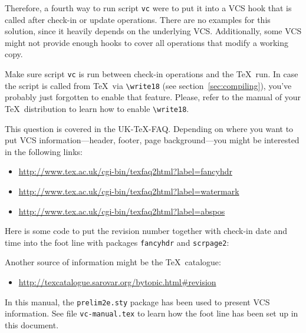 \documentclass[11pt]{article}
\begin{document}
Therefore, a fourth way to run script \texttt{vc} were to put it into a
VCS hook that is called after check-in or update operations.  There are
no examples for this solution, since it heavily depends on the
underlying VCS.  Additionally, some VCS might not provide enough hooks
to cover all operations that modify a working copy.

 Make sure script \texttt{vc} is run between
check-in operations and the \TeX\ run.  In case the script is called
from \TeX\ via \verb+\write18+ (see section~\ref{sec:compiling}), you've
probably just forgotten to enable that feature.  Please, refer to the
manual of your \TeX\ distribution to learn how to enable
\verb+\write18+.

 This question is covered in the UK-TeX-FAQ.
Depending on where you want to put VCS information---header, footer,
page background---you might be interested in the following links:
\begin{itemize}
\item \url{http://www.tex.ac.uk/cgi-bin/texfaq2html?label=fancyhdr}
\item \url{http://www.tex.ac.uk/cgi-bin/texfaq2html?label=watermark}
\item \url{http://www.tex.ac.uk/cgi-bin/texfaq2html?label=abspos}
\end{itemize}
Here is some code to put the revision number together with check-in date
and time into the foot line with packages \texttt{fancyhdr} and
\texttt{scrpage2}:
\begin{listing}[style=TeX]
\usepackage{fancyhdr}
\pagestyle{fancy}
\end{listing}
\begin{listing}[style=TeX]
\usepackage{scrpage2}
\pagestyle{scrheadings}
\end{listing}

Another source of information might be the \TeX\ catalogue:
\begin{itemize}
\item \url{http://texcatalogue.sarovar.org/bytopic.html#revision}
\end{itemize}
In this manual, the \texttt{prelim2e.sty} package has been used to
present VCS information.  See file \texttt{vc-manual.tex} to learn how
the foot line has been set up in this document.
\end{document}
